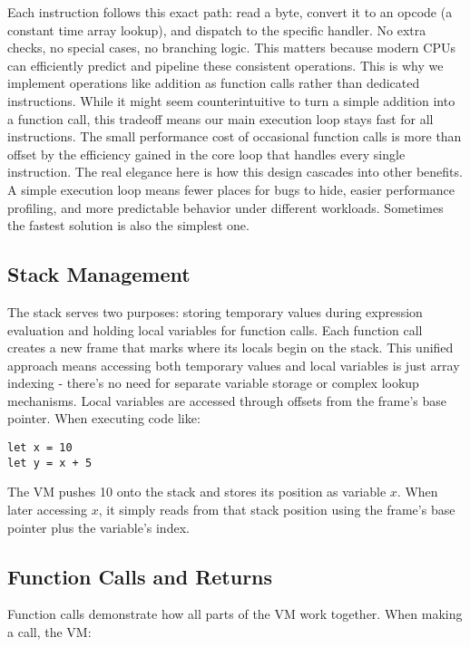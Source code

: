 Each instruction follows this exact path: read a byte, convert it to an opcode (a constant time array lookup), and dispatch to the specific handler.
No extra checks, no special cases, no branching logic.
This matters because modern CPUs can efficiently predict and pipeline these consistent operations.
This is why we implement operations like addition as function calls rather than dedicated instructions.
While it might seem counterintuitive to turn a simple addition into a function call, this tradeoff means our main execution loop stays fast for all instructions.
The small performance cost of occasional function calls is more than offset by the efficiency gained in the core loop that handles every single instruction.
The real elegance here is how this design cascades into other benefits.
A simple execution loop means fewer places for bugs to hide, easier performance profiling, and more predictable behavior under different workloads.
Sometimes the fastest solution is also the simplest one.

\subsection{Stack Management}\label{subsec:stack-management}

The stack serves two purposes: storing temporary values during expression evaluation and holding local variables for function calls.
Each function call creates a new frame that marks where its locals begin on the stack.
This unified approach means accessing both temporary values and local variables is just array indexing - there's no need for separate variable storage or complex lookup mechanisms.
Local variables are accessed through offsets from the frame's base pointer.
When executing code like:

\begin{verbatim}
let x = 10
let y = x + 5
\end{verbatim}
The VM pushes 10 onto the stack and stores its position as variable $x$.
When later accessing $x$, it simply reads 
from that stack position using the frame's base pointer plus the variable's index.

\subsection{Function Calls and Returns}\label{subsec:function-calls-and-returns}

Function calls demonstrate how all parts of the VM work together.
When making a call, the VM:

